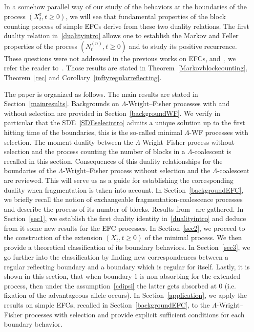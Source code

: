 \documentclass[10pt]{amsart}
\theoremstyle{definition}\newtheorem{defi}[theo]{Definition}\newtheorem{rema}[theo]{Remark}\newtheorem{exam}[theo]{Example}\newtheorem{exem}[theo]{Example}\newtheorem{nota}[theo]{Notation}
\newcommand{\rmr}{\mathrm{r}}
\begin{document}
In a somehow parallel way of our study of the behaviors at the boundaries of the process $(X^{\rmr}_t,t\geq 0)$, we will see that fundamental properties of the block counting process of simple EFCs derive from these two duality relations. The first duality relation in~\eqref{dualityintro} allows one to establish the Markov and Feller properties of the process $ (N_t^{(n)}, t\geq 0)$ and to study its positive recurrence. These questions were not addressed in the previous works on EFCs, \cite{MR2110018,cdiEFC} and~\cite{explosion}, we refer the reader to~\cite[Remark~2.14]{cdiEFC}. Those results are stated in Theorem~\ref{Markovblockcounting}, Theorem~\ref{rec} and Corollary~\ref{inftyregularreflecting}.



The paper is organized as follows. The main results are stated in Section~\ref{mainresults}. Backgrounds on $\Lambda$-Wright--Fisher processes with and without selection are provided in Section~\ref{backgroundWF}. We verify in particular that the SDE~\eqref{SDEselecintro} admits a unique solution up to the first hitting time of the boundaries, this is the so-called minimal $\Lambda$-WF processes with selection. The moment-duality between the $\Lambda$-Wright--Fisher process without selection and the process counting the number of blocks in a $\Lambda$-coalescent is recalled in this section. Consequences of this duality relationships for the boundaries of the $\Lambda$-Wright--Fisher process without selection and the $\Lambda$-coalescent are reviewed. This will serve us as a guide for establishing the corresponding duality when fragmentation is taken into account. In Section~\ref{backgroundEFC}, we briefly recall the notion of exchangeable fragmentation-coalescence processes and describe the process of its number of blocks. Results from~\cite{cdiEFC} are gathered. In Section~\ref{sec1}, we establish the first duality identity in~\eqref{dualityintro} and deduce from it some new results for the EFC processes. In Section~\ref{sec2}, we proceed to the construction of the extension $(X_t^{\rmr},t\geq 0)$ of the minimal process. We then provide a theoretical classification of its boundary behaviors. In Section~\ref{sec3}, we go further into the classification by finding new correspondences between a regular reflecting boundary and a boundary which is regular for itself. Lastly, it is shown in this section, that when boundary $1$ is non-absorbing for the extended process, then under the assumption~\eqref{cdipsi} the latter gets absorbed at $0$ (i.e. fixation of the advantageous allele occurs). In Section~\ref{application}, we apply the results on simple EFCs, recalled in Section~\ref{backgroundEFC}, to the $\Lambda$-Wright--Fisher processes with selection and provide explicit sufficient conditions for each boundary behavior.
\end{document}
